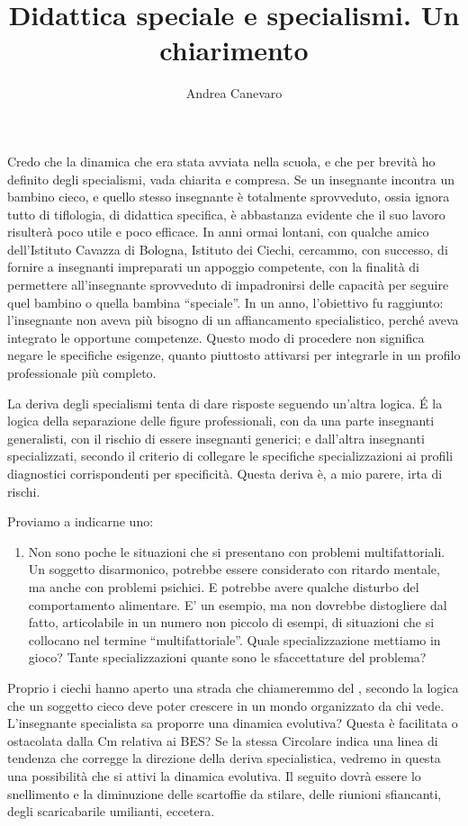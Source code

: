 \author{Andrea Canevaro}
\title{Didattica speciale e specialismi. Un chiarimento}
\label{Canevaro020713}
\maketitle
{}
Credo che la dinamica che era stata avviata nella scuola, e che per brevità ho definito degli specialismi, vada chiarita e compresa. Se un insegnante incontra un bambino cieco, e quello stesso insegnante è totalmente sprovveduto, ossia ignora tutto di tiflologia, di didattica specifica, è abbastanza evidente che il suo lavoro risulterà poco utile e poco efficace. In anni ormai lontani, con qualche amico dell'Istituto Cavazza di Bologna, Istituto dei Ciechi, cercammo, con successo, di fornire a insegnanti impreparati un appoggio competente, con la finalità di permettere all'insegnante sprovveduto di impadronirsi delle capacità per seguire quel bambino o quella bambina “speciale”. In un anno, l'obiettivo fu raggiunto: l'insegnante non aveva più bisogno di un affiancamento specialistico, perché aveva integrato le opportune competenze. Questo modo di procedere non significa negare le specifiche esigenze, quanto piuttosto attivarsi per integrarle in un profilo professionale più completo.

La deriva degli specialismi tenta di dare risposte seguendo un'altra logica. \'{E} la logica della separazione delle figure professionali, con da una parte insegnanti generalisti, con il rischio di essere insegnanti generici; e dall'altra insegnanti specializzati, secondo il criterio di collegare le specifiche specializzazioni ai profili diagnostici corrispondenti per specificità. Questa deriva è, a mio parere, irta di rischi.

Proviamo a indicarne uno:
\begin{enumerate}
	\item Non sono poche le situazioni che si presentano con problemi multifattoriali. Un soggetto disarmonico, potrebbe essere considerato con ritardo mentale, ma anche con problemi psichici. E potrebbe avere qualche disturbo del comportamento alimentare. E’ un esempio, ma non dovrebbe distogliere dal fatto, articolabile in un numero non piccolo di esempi, di situazioni che si collocano nel termine “multifattoriale”. Quale specializzazione mettiamo in gioco? Tante specializzazioni quante sono le sfaccettature del problema?
\end{enumerate}
Proprio i ciechi hanno aperto una strada che chiameremmo del , secondo la logica che un soggetto cieco deve poter crescere in un mondo organizzato da chi vede. L'insegnante specialista sa proporre una dinamica evolutiva? Questa è facilitata o ostacolata dalla Cm relativa ai BES? Se la stessa Circolare indica una linea di tendenza che corregge la direzione della deriva specialistica, vedremo in questa una possibilità che si attivi la dinamica evolutiva. Il seguito dovrà essere lo snellimento e la diminuzione delle scartoffie da stilare, delle riunioni sfiancanti, degli scaricabarile umilianti, eccetera.

